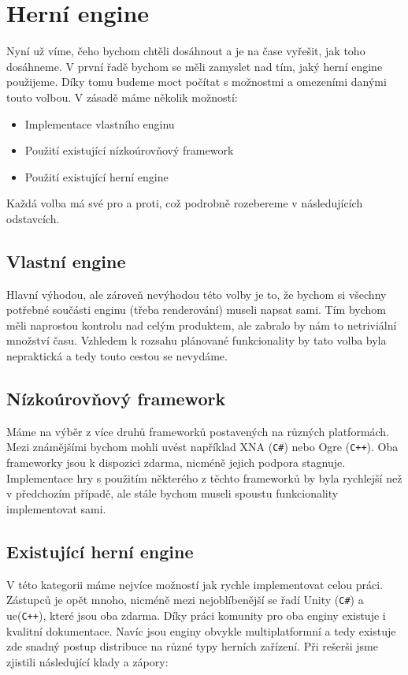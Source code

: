 
\section{Herní engine}
Nyní už víme, čeho bychom chtěli dosáhnout a je na čase vyřešit, jak toho dosáhneme. V první řadě bychom se měli zamyslet nad tím, jaký herní engine použijeme. Díky tomu budeme moct počítat s možnostmi a omezeními danými touto volbou. V zásadě máme několik možností:

\begin{itemize}
	\item Implementace vlastního enginu
	\item Použití existující nízkoúrovňový framework
	\item Použití existující herní engine
\end{itemize}

Každá volba má své pro a proti, což podrobně rozebereme v následujících odstavcích.

\subsection{Vlastní engine}
Hlavní výhodou, ale zároveň nevýhodou této volby je to, že bychom si všechny potřebné součásti enginu (třeba renderování) museli napsat sami. Tím bychom měli naprostou kontrolu nad celým produktem, ale zabralo by nám to netriviální množství času.
Vzhledem k rozsahu plánované funkcionality by tato volba byla nepraktická a tedy touto cestou se nevydáme.

\subsection{Nízkoúrovňový framework}
Máme na výběr z více druhů frameworků postavených na různých platformách. Mezi známějšími bychom mohli uvést například XNA (\texttt{C\#}) nebo Ogre (\texttt{C++}). Oba frameworky jsou k dispozici zdarma, nicméně jejich podpora stagnuje. Implementace hry s použitím některého z těchto frameworků by byla rychlejší než v předchozím případě, ale stále bychom museli spoustu funkcionality implementovat sami. 

\subsection{Existující herní engine}
V této kategorii máme nejvíce možností jak rychle implementovat celou práci. Zástupců je opět mnoho, nicméně mezi nejoblíbenější se řadí Unity (\texttt{C\#}) a \gls{ue}(\texttt{C++}), které jsou oba zdarma. Díky práci komunity pro oba enginy existuje i kvalitní dokumentace. Navíc jsou enginy obvykle multiplatformní a tedy existuje zde snadný postup distribuce na různé typy herních zařízení. Při rešerši jsme zjistili následující klady a zápory:

